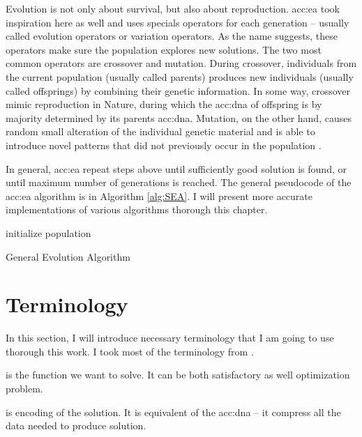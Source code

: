 Evolution is not only about survival, but also about reproduction. \acrlong*{acc:ea} took inspiration here as well and uses specials operators for each generation -- usually called evolution operators or variation operators. As the name suggests, these operators make sure the population explores new solutions. The two most common operators are crossover and mutation. During crossover, individuals from the current population (usually called parents) produces new individuals (usually called offsprings) by combining their genetic information. In some way, crossover mimic reproduction in Nature, during which the \acrshort{acc:dna} of offspring is by majority determined by its parents \acrshort{acc:dna}. Mutation, on the other hand, causes random small alteration of the individual genetic material and is able to introduce novel patterns that did not previously occur in the population \citep{HowToSolveItModernHeuristics}.

In general, \acrshort{acc:ea} repeat steps above until sufficiently good solution is found, or until maximum number of generations is reached. The general pseudocode of the \acrshort{acc:ea} algorithm is in Algorithm \ref{alg:SEA}. I will present more accurate implementations of various algorithms thorough this chapter.

\begin{algorithm}
    \SetAlgoLined
    initialize population\;
    \caption{General Evolution Algorithm}
    \label{alg:SEA}
\end{algorithm}




\section{Terminology}

In this section, I will introduce necessary terminology that I am going to use thorough this work. I took most of the terminology from \citet{IntroductionToEA}.

 is the function we want to solve. It can be both satisfactory as well optimization problem.

 is encoding of the solution. It is equivalent of the \acrshort{acc:dna} -- it compress all the data needed to produce solution.

